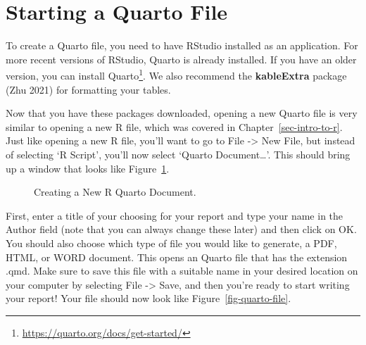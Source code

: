 \documentclass[
  letterpaper,
]{latex/krantz}
\renewcommand{\href}[2]{#2\footnote{\url{#1}}}
\begin{document}
\section{Starting a Quarto File}\label{starting-a-quarto-file}

To create a Quarto file, you need to have RStudio installed as an
application. For more recent versions of RStudio, Quarto is already
installed. If you have an older version, you can
\href{https://quarto.org/docs/get-started/}{install
Quarto}. We also recommend the
\textbf{kableExtra} package (Zhu 2021) for
formatting your tables.

Now that you have these packages downloaded, opening a new Quarto
file is very similar to opening a new R file,
which was covered in Chapter~\ref{sec-intro-to-r}. Just like opening a
new R file, you'll want to go to File -\textgreater{} New File, but
instead of selecting `R Script', you'll now select `Quarto
Document\ldots{}'. This should bring up a window that looks like
Figure~\ref{fig-new-quarto}.

\begin{figure}


\caption{\label{fig-new-quarto}Creating a New R Quarto Document.}

\end{figure}%

First, enter a title of your choosing for your report and type your name
in the Author field (note that you can always change these later) and
then click on OK. You should also choose which type of file you would
like to generate, a PDF, HTML, or WORD document. This opens an Quarto
file that has the extension .qmd. Make sure to save this file with a
suitable name in your desired location on your computer by selecting
File -\textgreater{} Save, and then you're ready to start writing your
report! Your file should now look like Figure~\ref{fig-quarto-file}.
\end{document}
